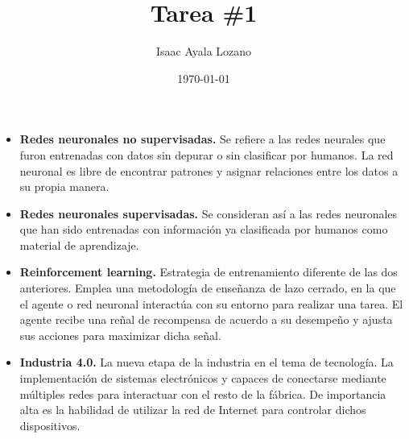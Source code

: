 \documentclass[a4paper,12pt]{article}
\title{Tarea \#1}
\author{Isaac Ayala Lozano}
\date{\today}
\begin{document}
\maketitle

\begin{itemize}
 \item \textbf{Redes neuronales no supervisadas.}
 Se refiere a las redes neurales que furon entrenadas con datos sin depurar o 
sin clasificar por humanos.
La red neuronal es libre de encontrar patrones y asignar relaciones entre los 
datos a su propia manera.
 
 \item \textbf{Redes neuronales supervisadas.} 
 Se consideran así a las redes neuronales que han sido entrenadas con 
información ya clasificada por humanos como material de aprendizaje.
 
 \item \textbf{Reinforcement learning.}
 Estrategia de entrenamiento diferente de las dos anteriores. 
 Emplea una metodología de enseñanza de lazo cerrado, en la que el agente o red 
neuronal interactúa con su entorno para realizar una tarea.
El agente recibe una reñal de recompensa de acuerdo a su desempeño y ajusta sus 
acciones para maximizar dicha señal.
 
 
 \item \textbf{Industria 4.0.}
 La nueva etapa de la industria en el tema de tecnología. La implementación de 
sistemas electrónicos y capaces de conectarse mediante múltiples redes para 
interactuar con el resto de la fábrica. De importancia alta es la habilidad de 
utilizar la red de Internet para controlar dichos dispositivos.
 
\end{itemize}







% 
\end{document}
